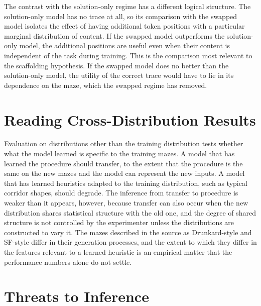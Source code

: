The contrast with the solution-only regime has a different logical structure. The solution-only model has no trace at all, so its comparison with the swapped model isolates the effect of having additional token positions with a particular marginal distribution of content. If the swapped model outperforms the solution-only model, the additional positions are useful even when their content is independent of the task during training. This is the comparison most relevant to the scaffolding hypothesis. If the swapped model does no better than the solution-only model, the utility of the correct trace would have to lie in its dependence on the maze, which the swapped regime has removed.

\section{Reading Cross-Distribution Results}

Evaluation on distributions other than the training distribution tests whether what the model learned is specific to the training mazes. A model that has learned the procedure should transfer, to the extent that the procedure is the same on the new mazes and the model can represent the new inputs. A model that has learned heuristics adapted to the training distribution, such as typical corridor shapes, should degrade. The inference from transfer to procedure is weaker than it appears, however, because transfer can also occur when the new distribution shares statistical structure with the old one, and the degree of shared structure is not controlled by the experimenter unless the distributions are constructed to vary it. The mazes described in the source as Drunkard-style and SF-style differ in their generation processes, and the extent to which they differ in the features relevant to a learned heuristic is an empirical matter that the performance numbers alone do not settle.

\section{Threats to Inference}

